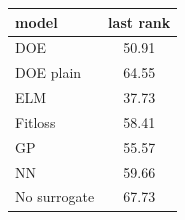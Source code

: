 \begin{tabular}{|lc|}
\hline
model & last rank\\
\hline
DOE & 50.91 \\
DOE plain & 64.55 \\
ELM & 37.73 \\
Fitloss & 58.41 \\
GP & 55.57 \\
NN & 59.66 \\
No surrogate & 67.73 \\
\hline
\end{tabular}
